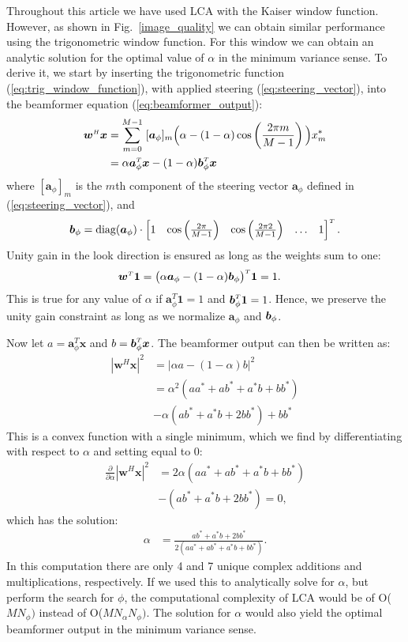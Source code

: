 \documentclass[10pt,journal,draftclsnofoot,onecolumn]{IEEEtran}
\newcommand\Fig[1]{Fig.~\ref{#1}}
\newcommand\nn{\nonumber\\}
\newcommand\sumb[2]{\sum\limits_{#1}^{#2}\;}
\newcommand\T{^{\scriptscriptstyle T}}
\renewcommand\H{^{\scriptscriptstyle H}}
\renewcommand\vec[1]{\boldsymbol{#1}}
\newcommand\1{\vec 1}
\renewcommand*\a{\vec a}
\newcommand*\w{\vec w}
\newcommand*\x{\vec x}
\begin{document}
Throughout this article we have used LCA with the Kaiser window function. However, as shown in \Fig{image_quality} we can obtain similar performance using the trigonometric window function. For this window we can obtain an analytic solution for the optimal value of $\alpha$ in the minimum variance sense. To derive it, we start by inserting the trigonometric function (\ref{eq:trig_window_function}), with applied steering (\ref{eq:steering_vector}), into the beamformer equation (\ref{eq:beamformer_output}):
%
\begin{align}
\w\H\x &= \sumb{m=0}{M-1} [\a_\phi]_m\Big(\alpha - (1-\alpha)\cos\left(\frac{2\pi m}{M-1}\right)\Big) x_m^* \nn
&= \alpha \a_\phi\T\x - (1-\alpha)\b_\phi\T\x
\end{align}
%
where $[\a_\phi]_m$ is the $m$th component of the steering vector $\a_\phi$ defined in (\ref{eq:steering_vector}), and 
%
\begin{align}
\b_\phi = \text{diag}(\a_\phi)\cdot\begin{bmatrix}
     1 &
     \cos\left(\frac{2\pi}{M-1}\right) &
     \cos\left(\frac{2\pi 2}{M-1}\right) &
     \hdots &
     1
     \end{bmatrix}\T.
\end{align}
%
Unity gain in the look direction is ensured as long as the weights sum to one:
%
\begin{align}
\w\T\1 &= \big(\alpha\a_\phi - (1-\alpha)\b_\phi\big)\T\1 = 1.
\end{align}
%
This is true for any value of $\alpha$ if $\a_\phi\T\1 = 1$ and $\b_\phi\T\1 = 1$. Hence, we  preserve the unity gain constraint as long as we normalize $\a_\phi$ and $\b_\phi$.

Now let $a=\a_\phi\T\x$ and $b=\b_\phi\T\x$. The beamformer output can then be written as:
%
\begin{align}
|\w\H\x|^2 &= \Big| \alpha a - (1-\alpha)b \Big|^2 \nn
&= \alpha^2 (aa^* + ab^* + a^*b + bb^*) \nn
&- \alpha(ab^* + a^*b + 2bb^*) + bb^*
\end{align}
%
This is a convex function with a single minimum, which we find by differentiating with respect to $\alpha$ and setting equal to 0:
%
\begin{align}
\frac{\partial}{\partial\alpha} |\w\H\x|^2 
&= 2\alpha (aa^* + ab^* + a^*b + bb^*) \nn
&- (ab^* + a^*b + 2bb^*) = 0,
\end{align}
%
which has the solution:
%
\begin{align}
\alpha &= \frac{ab^* + a^*b + 2bb^*}{2(aa^* + ab^* + a^*b + bb^*)}.
\end{align}
%
In this computation there are only 4 and 7 unique complex additions and multiplications, respectively. If we used this to analytically solve for $\alpha$, but perform the search for $\phi$, the computational complexity of LCA would be of O($MN_\phi)$ instead of O($MN_\alpha N_\phi)$. The solution for $\alpha$ would also yield the optimal beamformer output in the minimum variance sense.
\end{document}

